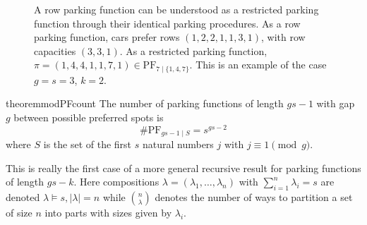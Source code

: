 \documentclass[12 pt]{amsart}
\theoremstyle{definition} %
\theoremstyle{remark} %
\begin{document}
\begin{figure}[h]
    \caption{A row parking function can be understood as a restricted parking function through their identical parking procedures. As a row parking function, cars prefer rows $(1,2,2,1,1,3,1)$, with row capacities $(3,3,1)$. As a restricted parking function, $\pi = (1, 4, 4, 1, 1, 7, 1) \in \mathrm{PF}_{7 \mid \{ 1, 4, 7 \}}$. This is an example of the case $g = s = 3$, $k = 2$.}
    \label{fig:row-parking}
\end{figure}


\begin{restatable}{theorem}{modPFcount}
	\label{thm:modPFcount}
	The number of parking functions of length $gs - 1$ with gap $g$ between possible preferred spots is
	\[
		\# \mathrm{PF}_{gs - 1 \mid S} = s^{gs - 2}
	\]
	where $S$ is the set of the first $s$ natural numbers $j$ with $j \equiv 1 \pmod g$.
\end{restatable}

This is really the first case of a more general recursive result for parking functions of length $gs - k$. Here compositions $\lambda = (\lambda_{1}, \dots, \lambda_{n})$ with $\sum_{i = 1}^{n} \lambda_{i} = s$ are denoted $\lambda\vDash s, \lvert\lambda\rvert = n$ while $\binom{n}{\lambda}$ denotes the number of ways to partition a set of size $n$ into parts with sizes given by $\lambda_i$.
\end{document}

